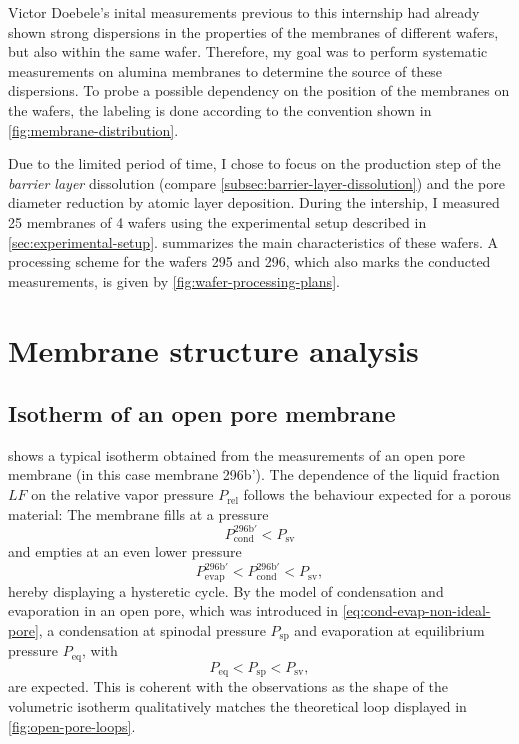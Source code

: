 \documentclass[../thesis.tex]{subfiles}
\begin{document}
        Victor Doebele's inital measurements previous to this internship had already shown strong dispersions in the properties of the membranes of different wafers, but also within the same wafer. Therefore, my goal was to perform systematic measurements on alumina membranes to determine the source of these dispersions. To probe a possible dependency on the position of the membranes on the wafers, the labeling is done according to the convention shown in \cref{fig:membrane-distribution}.

        Due to the limited period of time, I chose to focus on the production step of the \textit{barrier layer} dissolution (compare \cref{subsec:barrier-layer-dissolution}) and the pore diameter reduction by atomic layer deposition. During the intership, I measured 25 membranes of 4 wafers using the experimental setup described in \cref{sec:experimental-setup}.  summarizes the main characteristics of these wafers. A processing scheme for the wafers 295 and 296, which also marks the conducted measurements, is given by \cref{fig:wafer-processing-plans}.
        \medskip

        


    \section{Membrane structure analysis}

      \subsection{Isotherm of an open pore membrane}
      \label{subsec:open-pore-isotherm}

         shows a typical isotherm obtained from the measurements of an open pore membrane (in this case membrane 296b'). The dependence of the liquid fraction $LF$ on the relative vapor pressure $P_\mathrm{rel}$ follows the behaviour expected for a porous material: The membrane fills at a pressure
        \begin{equation*}
          P_\mathrm{cond}^\mathrm{296b'}<P_\mathrm{sv}
        \end{equation*}
        and empties at an even lower pressure
        \begin{equation*}
            P_\mathrm{evap}^\mathrm{296b'}<P_\mathrm{cond}^\mathrm{296b'}<P_\mathrm{sv},
        \end{equation*}
        hereby displaying a hysteretic cycle. By the model of condensation and evaporation in an open pore, which was introduced in \cref{eq:cond-evap-non-ideal-pore}, a condensation at spinodal pressure $P_\mathrm{sp}$ and evaporation at equilibrium pressure $P_\mathrm{eq}$, with
        \begin{equation*}
          P_\mathrm{eq}<P_\mathrm{sp}<P_\mathrm{sv},
        \end{equation*}
        are expected. This is coherent with the observations as the shape of the volumetric isotherm qualitatively matches the theoretical loop displayed in \cref{fig:open-pore-loops}.
\end{document}
